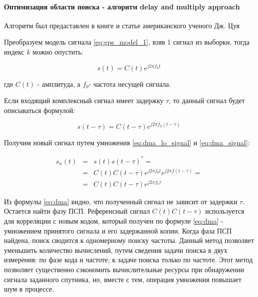 \paragraph{Оптимизация области поиска - алгоритм delay and multiply approach}
\label{ssec:dma}

Алгоритм был предаставлен в книге и статье американского ученого Дж.
Цуя \cite{lin_dma, tsui}

Преобразуем модель сигнала \ref{eq:gps_model_1}, взяв 1 сигнал из выборки, тогда индекс $k$ можно опустить:
\begin{center}
\begin{equation}
	\label{eq:dma_lo_signal}
	s(t)=C(t)e^{j2{\pi}f_{0}t}
\end{equation}
\end{center}
где $C(t)$ - амплитуда, а $f_{0}$- частота несущей сигнала.

Если входящий комплексный сигнал имеет задержку $\tau$, то данный
сигнал будет описываться формулой: 

\begin{center}
\begin{equation}
	\label{eq:dma_signal}
	s(t-\tau)=C(t-\tau)e^{j2{\pi}f_{0}(t-\tau)}
\end{equation}
\end{center}

Получим новый сигнал путем умножения \ref{eq:dma_lo_signal} и \ref{eq:dma_signal}:

\begin{center}
\begin{eqnarray}
	s_{n}(t) & = & s(t)s(t-\tau)^{*}=\nonumber \\
	 & = & C(t)C(t-\tau)e^{j2\pi f_{0}t}e^{j2\pi f(t-\tau)}=\label{eq:dma}\\
	 & = & C(t)C(t-\tau)e^{j2\pi f_{0}\tau}\nonumber 
\end{eqnarray}

\par\end{center}

Из формулы \ref{eq:dma} видно, что полученный сигнал не зависит от
задержки $\tau$. Остается найти фазу ПСП. Референсный сигнал
$C(t)C(t-\tau)$ используется для корреляции с новым кодом, который
получен по формуле \ref{eq:dma} - умножением принятого сигнала и его задержанной
копии. Когда фаза ПСП найдена, поиск сводится к одномерному поиску
частоты. Данный метод позволяет уменьшить количество вычислений, путем
сведения задачи поиска в двух измерения: по фазе кода и частоте; к
задаче поиска только по частоте. Этот метод позволяет существенно
сэкономить вычислительные ресурсы при обнаружении сигнала заданного
спутника, но, вместе с тем, операция умножения повышает шум в процессе.


